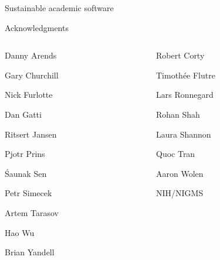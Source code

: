 \documentclass[12pt,t]{beamer}
\begin{document}
\begin{frame}{}

\vspace*{16.7mm}

\centerline{\Large Sustainable academic software}

\end{frame}







\begin{frame}[c]{Acknowledgments}

\begin{columns}[T]
  \begin{column}[T]{0.5\textwidth}
    \vspace{0pt}
\bi
\item[] Danny Arends
\item[] Gary Churchill
\item[] Nick Furlotte
\item[] Dan Gatti
\item[] Ritsert Jansen
\item[] Pjotr Prins
\item[] \'Saunak Sen
\item[] Petr Simecek
\item[] Artem Tarasov
\item[] Hao Wu
\item[] Brian Yandell
  \ei
  \end{column} \hfill
\begin{column}[T]{0.5\textwidth}
\vspace*{0mm}

  \bi
\item[] Robert Corty
\item[] Timoth\'ee Flutre
\item[] Lars Ronnegard
\item[] Rohan Shah
\item[] Laura Shannon
\item[] Quoc Tran
\item[] Aaron Wolen
\item[]
\item[] NIH/NIGMS
  \ei
\end{column}
\end{columns}

\end{frame}
\end{document}

